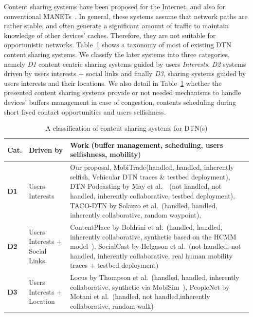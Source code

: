Content sharing systems have been proposed for the Internet, and also for conventional MANETs~\cite{BitHoc}. In general, these systems assume that network paths are rather stable, and often generate a significant amount of traffic to maintain knowledge of other devices' caches. Therefore, they are not suitable for opportunistic networks. Table~\ref{DisseminationSummary} shows a taxonomy of most of existing DTN content sharing systems. We classify the later systems into three categories, namely  
\emph{D1} content centric sharing systems guided by users \emph{Interests}, \emph{D2} systems driven by users interests + social links and finally
\emph{D3}, sharing systems guided by users interests and their locations. We also detail in Table~\ref{DisseminationSummary} whether the presented content sharing systems provide or not needed mechanisms to handle devices' buffers management in case of congestion, contents scheduling during short lived contact opportunities and users selfishness. 

\begin{table}[!h]
\renewcommand{\arraystretch}{1.1}
\caption{A classification of content sharing systems for DTN(s)}
\centering
\footnotesize
\begin{tabular}{|p{1cm}|p{2cm}|p{9.5cm}|}
\hline
\bfseries Cat. &\bfseries Driven by&\bfseries Work (buffer management, scheduling, users selfishness, mobility)\\
\hline
\bfseries D1&Users Interests & Our proposal, MobiTrade(handled, handled, inherently selfish, Vehicular DTN traces \& testbed deployment), DTN Podcasting by May et al.~\cite{May07wirelessopportunistic}~\cite{Lenders:Podcast}(not handled, not handled, inherently collaborative, testbed deployment), TACO-DTN by Solazzo et al.~\cite{TACODTN}(handled, handled, inherently collaborative, random waypoint), \\
\hline
\bfseries D2&Users Interests + Social Links &ContentPlace by Boldrini et al.~\cite{Chiara:MSWIM08}(handled, handled, inherently collaborative, synthetic based on the HCMM model~\cite{HCMM}), SocialCast by Helgason et al.~\cite{SocialCast2, SocialCast}(not handled, not handled, inherently collaborative, real human mobility traces + testbed deployment)\\
\hline
\bfseries D3&Users Interests + Location & Locus by Thompson et al.~\cite{LOCUS}(handled, handled, inherently collaborative, synthetic via MobiSim~\cite{MobiSim}), PeopleNet by Motani et al.~\cite{Peoplenet}(handled, not handled,inherently collaborative, random walk)\\
\hline
\end{tabular}
\label{DisseminationSummary}
\end{table}


